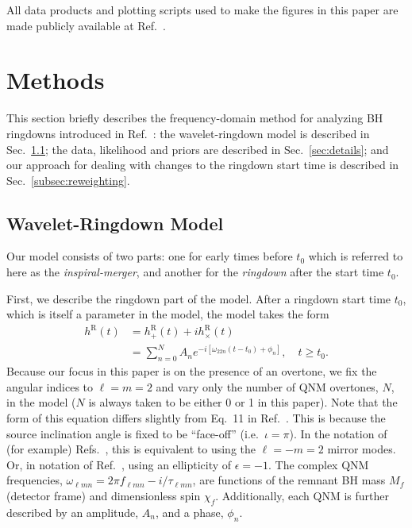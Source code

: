 All data products and plotting scripts used to make the figures in this paper are made publicly available at Ref.~\cite{finch_eliot_zenodo}.


\section{Methods}\label{sec:analysis}

This section briefly describes the frequency-domain method for analyzing BH ringdowns introduced in Ref.~\cite{Finch:2021qph}:
the wavelet-ringdown model is described in Sec.~\ref{sec:model}; the data, likelihood and priors are described in Sec.~\ref{sec:details}; and our approach for dealing with changes to the ringdown start time is described in Sec.~\ref{subsec:reweighting}.


\subsection{Wavelet-Ringdown Model}\label{sec:model}

Our model consists of two parts: one for early times before $t_0$ which is referred to here as the \emph{inspiral-merger}, and another for the \emph{ringdown} after the start time $t_0$.

First, we describe the ringdown part of the model.
After a ringdown start time $t_0$, which is itself a parameter in the model, the model takes the form
\begin{align}
	h^\mathrm{R}(t) &= h_+^\mathrm{R}(t) + ih_\times^\mathrm{R}(t) \nonumber \\
	&= \sum_{n=0}^N A_n e^{-i[\omega_{22n}(t-t_0) + \phi_{n}]}, \quad t \geq t_0. \label{eq:ringdown_model}
\end{align}
Because our focus in this paper is on the presence of an overtone, we fix the angular indices to $\ell = m = 2$ and vary only the number of QNM overtones, $N$, in the model ($N$ is always taken to be either 0 or 1 in this paper). 
Note that the form of this equation differs slightly from Eq.~11 in Ref.~\cite{Finch:2021qph}. This is because the source inclination angle is fixed to be ``face-off'' (i.e.\ $\iota=\pi$).
In the notation of (for example) Refs.~\cite{Dhani:2020nik, Finch:2021iip, MaganaZertuche:2021syq}, this is equivalent to using the $\ell = -m = 2$ mirror modes. 
Or, in notation of Ref.~\cite{Isi:2021iql}, using an ellipticity of $\epsilon = -1$.
The complex QNM frequencies, $\omega_{\ell m n} = 2\pi f_{\ell m n} - i/\tau_{\ell m n}$, are functions of the remnant BH mass $M_f$ (detector frame) and dimensionless spin $\chi_f$.
Additionally, each QNM is further described by an amplitude, $A_{n}$, and a phase, $\phi_{n}$. 

